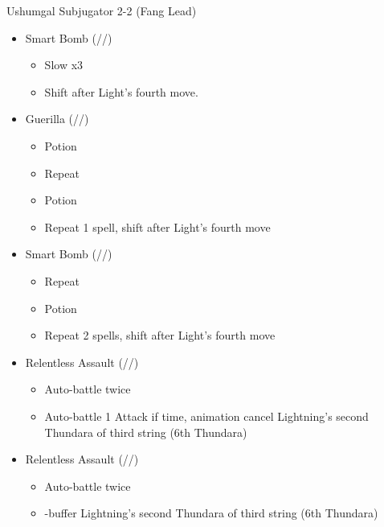 \begin{multicols}{2}
  \renewcommand{\first}{[1] Aggression (\com/\com/\rav)}
  \renewcommand{\second}{[2] Relentless Assault (\com/\rav/\rav)}
  \renewcommand{\third}{[3] Smart Bomb (\sab/\rav/\rav)}
  \renewcommand{\fourth}{[4] Mystic Tower (\sen/\rav/\rav)}
  \renewcommand{\fifth}{[5] Guerilla (\sab/\rav/\syn)}
  \renewcommand{\sixth}{[6] Relentless Assault (\com/\rav/\rav)}

  \begin{battle}{Ushumgal Subjugator 2-2 (Fang Lead)}
    \begin{itemize}
      \item \third
            \begin{itemize}
              \item Slow x3
              \item Shift after Light's fourth move.
            \end{itemize}
      \item \fifth
            \begin{itemize}
              \item Potion
              \item Repeat
              \item Potion
              \item Repeat 1 spell, shift after Light's fourth move
            \end{itemize}
      \item \third
            \begin{itemize}
              \item Repeat
              \item Potion
              \item Repeat 2 spells, shift after Light's fourth move
            \end{itemize}
      \item \second
            \begin{itemize}
              \item Auto-battle twice
              \item Auto-battle 1 Attack if time, animation cancel Lightning's second Thundara of third string (6th Thundara)
            \end{itemize}
      \item \sixth
            \begin{itemize}
              \item Auto-battle twice
              \item \com-buffer Lightning's second Thundara of third string (6th Thundara)

\end{itemize}
\end{itemize}
\end{battle}
\end{multicols}
